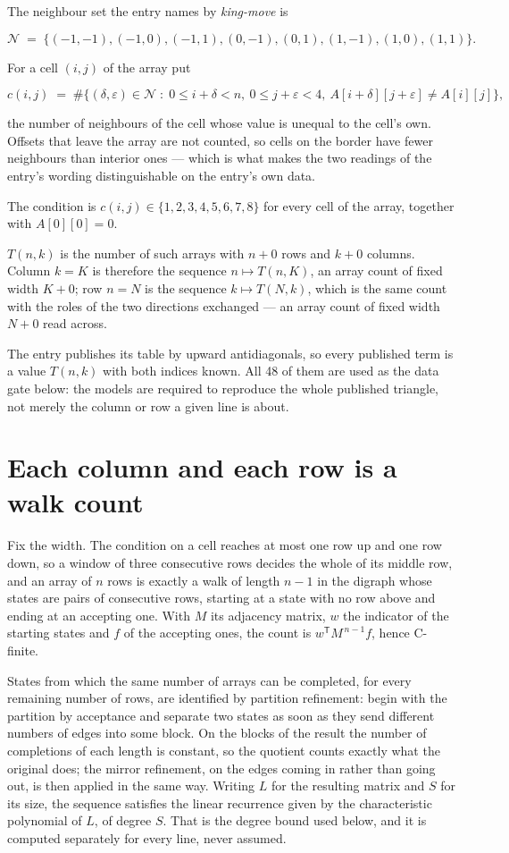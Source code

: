 \documentclass[11pt]{article}
\theoremstyle{definition}
\begin{document}
The neighbour set the entry names by {\itshape king-move} is

\[\mathcal{N} \;=\; \{(-1,-1), (-1,0), (-1,1), (0,-1), (0,1), (1,-1), (1,0), (1,1)\}.\]

For a cell $(i,j)$ of the array put

\[c(i,j) \;=\; \#\bigl\{(\delta,\varepsilon)\in\mathcal{N} \;:\; 0\le i+\delta<n,\ 0\le j+\varepsilon<4,\ A[i+\delta][j+\varepsilon] \neq A[i][j]\bigr\},\]

the number of neighbours of the cell whose value is unequal to the cell's own. Offsets that leave the array are not counted, so cells on the border have fewer neighbours than interior ones --- which is what makes the two readings of the entry's wording distinguishable on the entry's own data.

The condition is $c(i,j) \in \{1, 2, 3, 4, 5, 6, 7, 8\}$ for every cell of the array, together with $A[0][0]=0$.

$T(n,k)$ is the number of such arrays with $n + 0$ rows and $k + 0$ columns. Column $k = K$ is therefore the sequence $n \mapsto T(n,K)$, an array count of fixed width $K + 0$; row $n = N$ is the sequence $k \mapsto T(N,k)$, which is the same count with the roles of the two directions exchanged --- an array count of fixed width $N + 0$ read across.

The entry publishes its table by upward antidiagonals, so every published term is a value $T(n,k)$ with both indices known. All 48 of them are used as the data gate below: the models are required to reproduce the whole published triangle, not merely the column or row a given line is about.

\section{Each column and each row is a walk count}

Fix the width. The condition on a cell reaches at most one row up and one row down, so a window of three consecutive rows decides the whole of its middle row, and an array of $n$ rows is exactly a walk of length $n-1$ in the digraph whose states are pairs of consecutive rows, starting at a state with no row above and ending at an accepting one. With $M$ its adjacency matrix, $w$ the indicator of the starting states and $f$ of the accepting ones, the count is $w^{\mathsf T}M^{\,n-1}f$, hence C-finite.

States from which the same number of arrays can be completed, for every remaining number of rows, are identified by partition refinement: begin with the partition by acceptance and separate two states as soon as they send different numbers of edges into some block. On the blocks of the result the number of completions of each length is constant, so the quotient counts exactly what the original does; the mirror refinement, on the edges coming in rather than going out, is then applied in the same way. Writing $L$ for the resulting matrix and $S$ for its size, the sequence satisfies the linear recurrence given by the characteristic polynomial of $L$, of degree $S$. That is the degree bound used below, and it is computed separately for every line, never assumed.
\end{document}
